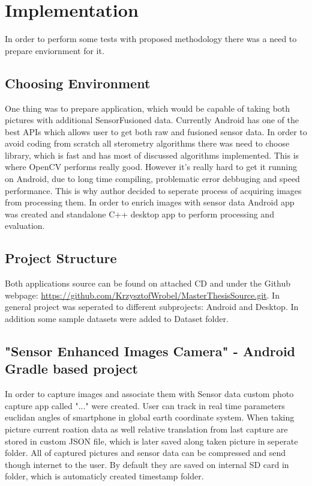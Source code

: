\raggedbottom
\chapter{Implementation} %
In order to perform some tests with proposed methodology there was a need to prepare enviornment for it. 
\section{Choosing Environment}
One thing was to prepare application, which would be capable of taking both pictures with additional SensorFusioned data. Currently Android has one of the best APIs which allows user to get both raw and fusioned sensor data. In order to avoid coding from scratch all sterometry algorithms there was need to choose library, which is fast and has most of discussed algorithms implemented. This is where OpenCV performs really good. However it's really hard to get it running on Android, due to long time compiling, problematic error debbuging and speed performance. This is why author decided to seperate process of acquiring images from processing them. In order to enrich images with sensor data Android app was created and standalone C++ desktop app to perform processing and evaluation.
\section{Project Structure} \label{sec:ProjectStructure}
Both applications source can be found on attached CD and under the Github webpage: \url{https://github.com/KrzysztofWrobel/MasterThesisSource.git}. In general project was seperated to different subprojects: Android and Desktop. In addition some sample datasets were added to Dataset folder.
\section{"Sensor Enhanced Images Camera" - Android Gradle based project}
In order to capture images and associate them with Sensor data custom photo capture app called "..." were created. User can track in real time parameters euclidan angles of smartphone in global earth coordinate system. When taking picture current roation data as well relative translation from last capture are stored in custom JSON file, which is later saved along taken picture in seperate folder. All of captured pictures and sensor data can be compressed and send though internet to the user. By default they are saved on internal SD card in folder, which is automaticly created timestamp folder.

